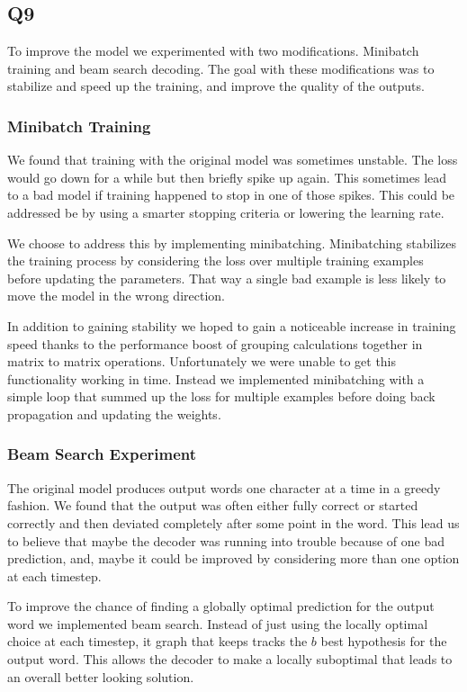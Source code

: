 \documentclass[12pt]{article}
\begin{document}
\subsection{Q9}

To improve the model we experimented with two modifications. Minibatch training and beam search decoding. The goal with these modifications was to stabilize and speed up the training, and improve the quality of the outputs.

\subsubsection{Minibatch Training}

We found that training with the original model was sometimes unstable. The loss would go down for a while but then briefly spike up again. This sometimes lead to a bad model if training happened to stop in one of those spikes. This could be addressed be by using a smarter stopping criteria or lowering the learning rate. 

We choose to address this by implementing minibatching. Minibatching stabilizes the training process by considering the loss over multiple training examples before updating the parameters. That way a single bad example is less likely to move the model in the wrong direction.

In addition to gaining stability we hoped to gain a noticeable increase in training speed thanks to the performance boost of grouping calculations together in matrix to matrix operations. Unfortunately we were unable to get this functionality working in time. 
Instead we implemented minibatching with a simple loop that summed up the loss for multiple examples before doing back propagation and updating the weights.

\subsubsection{Beam Search Experiment}

The original model produces output words one character at a time in a greedy fashion.
We found that the output was often either fully correct or started correctly and then deviated completely after some point in the word. This lead us to believe that maybe the decoder was running into trouble because of one bad prediction, and, maybe it could be improved by considering more than one option at each timestep.

To improve the chance of finding a globally optimal prediction for the output word we implemented beam search. Instead of just using the locally optimal choice at each timestep, it graph that keeps tracks the $b$ best hypothesis for the output word. This allows the decoder to make a locally suboptimal that leads to an overall better looking solution.
\end{document}
